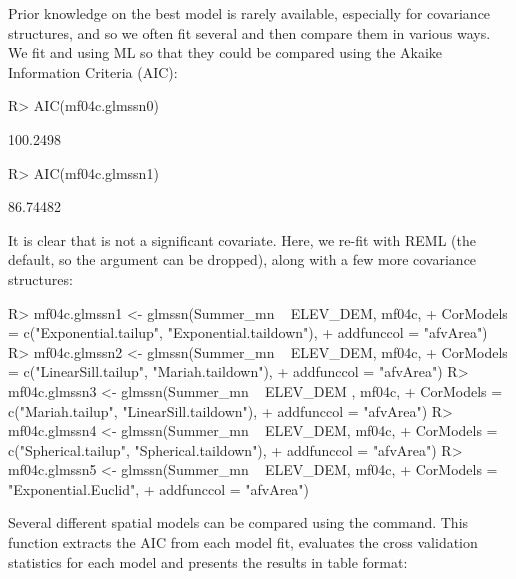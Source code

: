 \documentclass[nojss]{jss}
\renewenvironment{Schunk}{\vspace{\topsep}}{\vspace{\topsep}}
\begin{document}
Prior knowledge on the best model is rarely available, especially for
covariance structures, and so we often fit several and then compare
them in various ways. We fit  and
 using ML so that they could be compared using the
Akaike Information Criteria (AIC):

\begin{Schunk}
\begin{Sinput}
R> AIC(mf04c.glmssn0)
\end{Sinput}
\begin{Soutput}
[1] 100.2498
\end{Soutput}
\begin{Sinput}
R> AIC(mf04c.glmssn1)
\end{Sinput}
\begin{Soutput}
[1] 86.74482
\end{Soutput}
\end{Schunk}

It is clear that  is not a significant covariate.  Here,
we re-fit  with REML (the default, so the
 argument can be dropped), along with a few more
covariance structures:

\begin{Schunk}
\begin{Sinput}
R> mf04c.glmssn1 <- glmssn(Summer_mn ~ ELEV_DEM, mf04c,
+     CorModels = c("Exponential.tailup", "Exponential.taildown"),
+     addfunccol = "afvArea")
R> mf04c.glmssn2 <- glmssn(Summer_mn ~ ELEV_DEM,  mf04c,
+     CorModels = c("LinearSill.tailup", "Mariah.taildown"),
+     addfunccol = "afvArea")
R> mf04c.glmssn3 <- glmssn(Summer_mn ~ ELEV_DEM , mf04c,
+     CorModels =  c("Mariah.tailup", "LinearSill.taildown"),
+     addfunccol = "afvArea")
R> mf04c.glmssn4 <- glmssn(Summer_mn ~ ELEV_DEM, mf04c,
+     CorModels = c("Spherical.tailup", "Spherical.taildown"),
+     addfunccol = "afvArea")
R> mf04c.glmssn5 <- glmssn(Summer_mn ~ ELEV_DEM, mf04c,
+     CorModels = "Exponential.Euclid",
+     addfunccol = "afvArea")
\end{Sinput}
\end{Schunk}

Several different spatial models can be compared using the
 command. This function extracts the AIC from
each model fit, evaluates the cross validation statistics for each
model and presents the results in table format:
\end{document}
